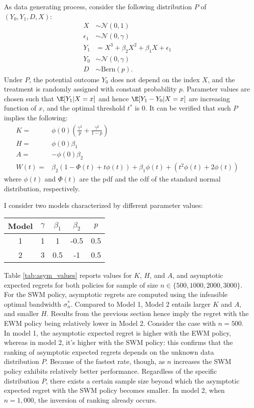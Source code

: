 {As data generating process, consider the following distribution $P$ of $(Y_0, Y_1, D, X)$:
\begin{align*}
    X &\sim \mathcal{N} (0,1) \\
    \epsilon_1 &\sim \mathcal{N}(0,\gamma) \\
    Y_1 &= X^3 + \beta_2 X^2 + \beta_1 X + \epsilon_1 \\
    Y_0 &\sim \mathcal{N}(0,\gamma) \\
    D &\sim \text{Bern}(p).
\end{align*}
Under $P$, the potential outcome $Y_0$ does not depend on the index $X$, and the treatment is randomly assigned with constant probability $p$. Parameter values are chosen such that $\E[Y_1|X=x]$ and hence $\E[Y_1 - Y_0|X=x]$ are increasing function of $x$, and the optimal threshold $t^*$ is 0. It can be verified that such $P$ implies the following:
\begin{align*}
    K =& \phi(0) \left(\frac{\gamma^2}{p} + \frac{\gamma^2}{1-p}\right) \\
    H =& \phi(0) \beta_1 \\
    A =& -\phi(0) \beta_2 \\
    W(t) =& \beta_2 \left( 1- \Phi(t) + t \phi(t) \right) +
    \beta_1 \phi(t) + \left( t^2 \phi(t) + 2\phi(t) \right)
\end{align*}
where $\phi(t)$ and $\Phi(t)$ are the pdf and the cdf of the standard normal distribution, respectively.

I consider two models characterized by different parameter values:
\begin{table}[h] \centering \small
\begin{tabular}{c|cccc}
\hline \hline
 Model & $\gamma$ & $\beta_1$ & $\beta_2$ & $p$  \\ \hline
 1 & 1 & 1 & -0.5 & 0.5 \\
 2 & 3 & 0.5 & -1 & 0.5 \\ \hline
\end{tabular}
\end{table}

Table \ref{tab:asym_values} reports values for $K$, $H$, and $A$, and asymptotic expected regrets for both policies for sample of size $n \in \{500, 1000, 2000, 3000\}$. For the SWM policy, asymptotic regrets are computed using the infeasible optimal bandwidth $\sigma_n^*$. Compared to Model 1, Model 2 entails larger $K$ and $A$, and smaller $H$. Results from the previous section hence imply the regret with the EWM policy being relatively lower in Model 2. Consider the case with $n=500$. In model 1, the asymptotic expected regret is higher with the EWM policy, whereas in model 2, it's higher with the SWM policy: this confirms that the ranking of asymptotic expected regrets depends on the unknown data distribution $P$. Because of the fastest rate, though, as $n$ increases the SWM policy exhibits relatively better performance. Regardless of the specific distribution $P$, there exists a certain sample size beyond which the asymptotic expected regret with the SWM policy becomes smaller. In model 2, when $n=1,000$, the inversion of ranking already occurs.

}
